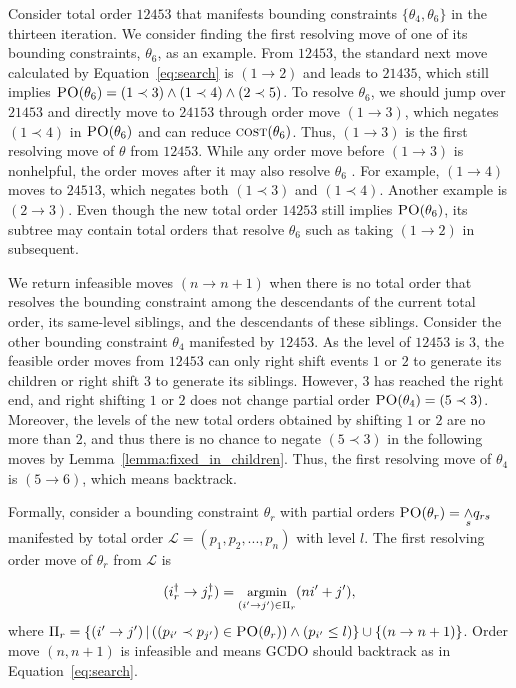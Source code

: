 \documentclass[letterpaper]{article} %
\theoremstyle{definition}
\newcommand{\LE}{\mathcal{L}}
\begin{document}
Consider total order $12453$ that manifests bounding constraints $\{\theta_4, \theta_6\}$ in the thirteen iteration. We consider finding the first resolving move of one of its bounding constraints, $\theta_6$, as an example. From $12453$, the standard next move calculated by Equation~\ref{eq:search} is $(1 \rightarrow 2)$ and leads to $21435$, which still implies $\textsc{PO}(\theta_6)=(1 \prec 3) \land (1 \prec 4) \land (2 \prec 5)$. To resolve $\theta_6$, we should jump over $21453$ and directly move to $24153$ through order move $(1 \rightarrow 3)$, which negates $(1 \prec 4)$ in $\textsc{PO}(\theta_6)$ and can reduce $\textsc{cost}(\theta_6)$. Thus, $(1 \rightarrow 3)$ is the first resolving move of $\theta$ from $12453$. While any order move before $(1 \rightarrow 3)$ is nonhelpful, the order moves after it may also resolve $\theta_6$ . For example, $(1 \rightarrow 4)$ moves to $24513$, which negates both $(1 \prec 3)$ and $(1 \prec 4)$. Another example is $(2 \rightarrow 3)$. Even though the new total order $14253$ still implies $\textsc{PO}(\theta_6)$, its subtree may contain total orders that resolve $\theta_6$ such as taking $(1 \rightarrow 2)$ in subsequent.

We return infeasible moves $(n \rightarrow n+1)$ when there is no total order that resolves the bounding constraint among the descendants of the current total order, its same-level siblings, and the descendants of these siblings. Consider the other bounding constraint $\theta_4$ manifested by $12453$. As the level of $12453$ is $3$, the feasible order moves from $12453$ can only right shift events $1$ or $2$ to generate its children or right shift $3$ to generate its siblings. However, $3$ has reached the right end, and right shifting $1$ or $2$ does not change partial order $\textsc{PO}(\theta_4) = (5 \prec 3)$. Moreover, the levels of the new total orders obtained by shifting $1$ or $2$ are no more than $2$, and thus there is no chance to negate $(5 \prec 3)$ in the following moves by Lemma~\ref{lemma:fixed_in_children}. Thus, the first resolving move of $\theta_4$ is $(5 \rightarrow 6)$, which means backtrack.

Formally, consider a bounding constraint $\theta_r$ with partial orders $\textsc{PO}(\theta_r) = \underset{s}{\land} q_{rs}$ manifested by total order $\LE=(p_1,p_2,...,p_n)$ with level $l$. The first resolving order move of $\theta_r$ from $\LE$ is

\begin{equation}
\label{eq:single_resolution}\small
    (i^{\dagger}_r \rightarrow j^{\dagger}_r) = \underset{(i' \rightarrow j') \in \Pi_r}{\text{argmin}} (ni'+j'),
\end{equation}
where $\Pi_r= \{(i' \rightarrow j') \, | \, ((p_{i'} \prec p_{j'}) \in \textsc{PO}(\theta_r))  \land (p_{i'} \leq l)\} \cup \{(n \rightarrow n+1)\}$. Order move $(n, n+1)$ is infeasible and means GCDO should backtrack as in Equation~\ref{eq:search}.
\end{document}
